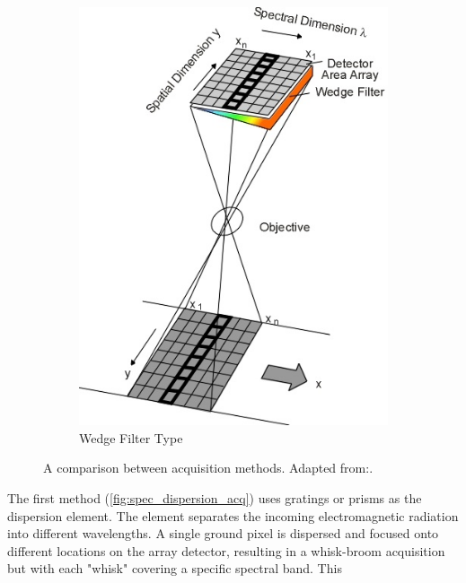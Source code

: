 \begin{figure}[H]
\begin{subfigure}[b]{0.45\textwidth}
    \end{subfigure}
    \begin{subfigure}[b]{0.45\textwidth}
        \includegraphics[width=\textwidth]{figures/Orbiter/spectrometer_wedge_nieke}
        \caption{Wedge Filter Type}\label{fig:spec_wedge_acq}
    \end{subfigure}
    \caption{A comparison between acquisition methods. Adapted from:\cite{nieke1997a}.}\label{fig:spec_acquisition_compare}
\end{figure}
The first method (\ref{fig:spec_dispersion_acq}) uses gratings or prisms as the dispersion element. The element separates the incoming electromagnetic radiation into different wavelengths. A single ground pixel is dispersed and focused onto different locations on the array detector\cite{nieke1997a}, resulting in a whisk-broom acquisition but with each "whisk" covering a specific spectral band. This

